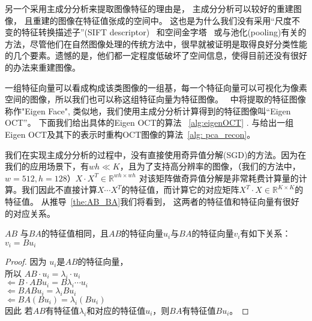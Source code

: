         另一个采用主成分分析来提取图像特征的理由是， 主成分分析可以较好的重建图像， 且重建的图像在特征值张成的空间中。  这也是为什么我们没有采用“尺度不变的特征转换描述子”(SIFT descriptor) ~\cite{yang2009linear}和空间金字塔~\cite{lazebnik2006beyond} 或与池化(pooling)有关的方法，尽管他们在自然图像处理的传统方法中，很早就被证明是取得良好分类性能的几个要素。遗憾的是，他们都一定程度低破坏了空间信息，使得目前还没有很好的办法来重建图像。

        一组特征向量可以看成构成该类图像的一组基，每一个特征向量可以可视化为像素空间的图像，所以我们也可以称这组特征向量为特征图像。~\cite{turk1991eigenfaces} 中将提取的特征图像称作"Eigen Face", 类似地，我们使用主成分分析计算得到的特征图像叫“Eigen OCT”。 下面我们给出具体的Eigen OCT的算法 ~\ref{alg:eigenOCT}  . 与给出一组Eigen OCT及其下的表示时重构OCT图像的算法~\ref{alg: pca_recon}。

        我们在实现主成分分析的过程中，没有直接使用奇异值分解(SGD)的方法。因为在我们的应用场景下，有$wh \ll K$，且为了支持高分辨率的图像，（我们的方法中，$w = 512, h = 128$）$X\cdot X^T \in \mathbb{R}^{wh \times wh}$ 对该矩阵做奇异值分解是非常耗费计算量的计算。我们因此不直接计算$X\cdots  X^T$的特征值，而计算它的对应矩阵$X^T \cdot X \in \mathbb{R} ^{K \times K}$的特征值。 从推导~\ref{the:AB_BA}我们将看到， 这两者的特征值和特征向量有很好的对应关系。

        \begin{theorem}\label{the:AB_BA}
            $AB$ 与$BA$的特征值相同，且$AB$的特征向量$u_i$与$BA$的特征向量$v_i$有如下关系：$v_i = Bu_i$
        \end{theorem}
        \begin{proof}
        
            因为 $u_i$是$AB$的特征向量，\\
            所以  $AB \cdot u_i = \lambda_i \cdot u_i$\\
            $\Leftarrow B\cdot AB u_i = B \lambda_i \cdots u_i$\\
            $\Leftarrow BAB u_i = \lambda_i B u_i$\\
            $\Leftarrow BA(Bu_i)= \lambda_i (Bu_i)$\\
            因此 若$AB$有特征值$\lambda_i$和对应的特征值$u_i$，则$BA$有特征值$Bu_i$。
        
        \end{proof}


